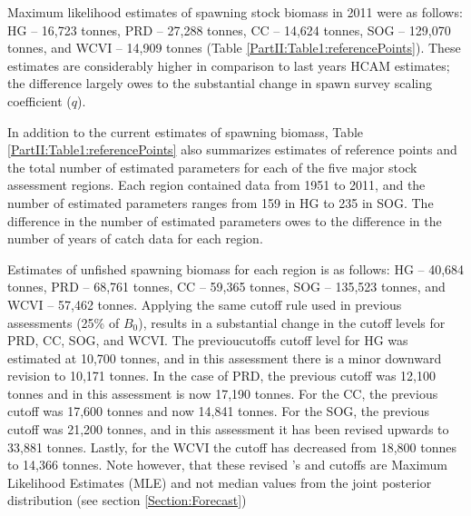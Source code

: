 Maximum likelihood estimates of spawning stock biomass in 2011 were as follows: HG -- 16,723 tonnes, PRD -- 27,288 tonnes, CC -- 14,624 tonnes, SOG -- 129,070 tonnes, and WCVI -- 14,909 tonnes (Table \ref{PartII:Table1:referencePoints}).  These estimates are considerably higher in comparison to last years HCAM estimates; the difference largely owes to the substantial change in spawn survey scaling coefficient ($q$).

In addition to the current estimates of spawning biomass, Table \ref{PartII:Table1:referencePoints} also summarizes estimates of reference points and the total number of estimated parameters for each of the five major stock assessment regions.  Each region contained data from 1951 to 2011, and the number of estimated parameters ranges from 159 in HG to 235 in SOG.  The difference in the number of estimated parameters owes to the difference in the number of years of catch data for each region.

Estimates of unfished spawning biomass for each region is as follows: HG -- 40,684 tonnes, PRD -- 68,761 tonnes, CC -- 59,365 tonnes, SOG -- 135,523 tonnes, and WCVI -- 57,462 tonnes.  Applying the same cutoff rule used in previous assessments (25\% of $B_0$), results in a substantial change in the cutoff levels for PRD, CC, SOG, and WCVI.  The previoucutoffs cutoff level for HG was estimated at 10,700 tonnes, and in this assessment there is a minor downward revision to 10,171 tonnes.  In the case of PRD, the previous cutoff was 12,100 tonnes and in this assessment is now 17,190 tonnes.  For the CC, the previous cutoff was 17,600 tonnes and now 14,841 tonnes.  For the SOG, the previous cutoff was 21,200 tonnes, and in this assessment it has been revised upwards to 33,881 tonnes.  Lastly, for the WCVI the cutoff has decreased from 18,800 tonnes to 14,366 tonnes. Note however, that these revised \bo's and cutoffs are Maximum Likelihood Estimates (MLE) and not median values from the joint posterior distribution (see section \ref{Section:Forecast})





